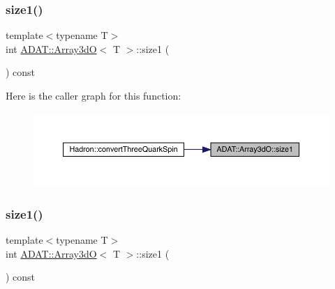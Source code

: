 \mbox{\label{classADAT_1_1Array3dO_a30149908b955c7eeebec86a24e6afffd}} 
\subsubsection{\texorpdfstring{size1()}{size1()}\hspace{0.1cm}{\footnotesize\ttfamily [2/3]}}
{\footnotesize\ttfamily template$<$typename T$>$ \\
int \mbox{\hyperlink{classADAT_1_1Array3dO}{A\+D\+A\+T\+::\+Array3dO}}$<$ T $>$\+::size1 (\begin{DoxyParamCaption}{ }\end{DoxyParamCaption}) const\hspace{0.3cm}{\ttfamily [inline]}}

Here is the caller graph for this function\+:
\nopagebreak
\begin{figure}[H]
\begin{center}
\leavevmode
\includegraphics[width=350pt]{dd/da8/classADAT_1_1Array3dO_a30149908b955c7eeebec86a24e6afffd_icgraph}
\end{center}
\end{figure}
\mbox{\label{classADAT_1_1Array3dO_a30149908b955c7eeebec86a24e6afffd}} 
\subsubsection{\texorpdfstring{size1()}{size1()}\hspace{0.1cm}{\footnotesize\ttfamily [3/3]}}
{\footnotesize\ttfamily template$<$typename T$>$ \\
int \mbox{\hyperlink{classADAT_1_1Array3dO}{A\+D\+A\+T\+::\+Array3dO}}$<$ T $>$\+::size1 (\begin{DoxyParamCaption}{ }\end{DoxyParamCaption}) const\hspace{0.3cm}{\ttfamily [inline]}}

